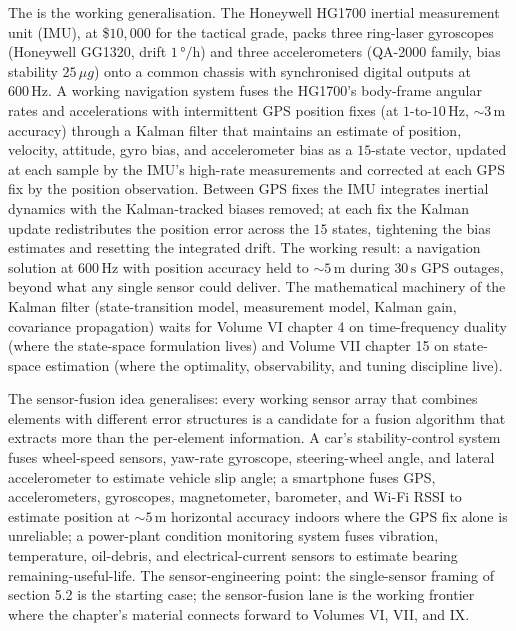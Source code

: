 The  is the working generalisation. The
Honeywell HG1700 \cite{text:ch05t3b-honeywell-hg1700-datasheet}
inertial measurement unit (IMU), at \$$10{,}000$ for the tactical
grade, packs three ring-laser gyroscopes (Honeywell GG1320, drift
$1 \,\si{\degree}/\si{\hour}$) and three accelerometers
(QA-2000 family, bias stability $25 \,\mu g$) onto a common
chassis with synchronised digital outputs at $600 \,\si{\hertz}$. A
working navigation system fuses the HG1700's body-frame angular
rates and accelerations with intermittent GPS position fixes (at
$1$-to-$10 \,\si{\hertz}$, $\sim 3 \,\si{\meter}$ accuracy) through
a Kalman filter that maintains an estimate of position, velocity,
attitude, gyro bias, and accelerometer bias as a $15$-state vector,
updated at each sample by the IMU's high-rate measurements and
corrected at each GPS fix by the position observation. Between GPS
fixes the IMU integrates inertial dynamics with the Kalman-tracked
biases removed; at each fix the Kalman update redistributes the
position error across the $15$ states, tightening the bias estimates
and resetting the integrated drift. The working result: a navigation
solution at $600 \,\si{\hertz}$ with position accuracy held to
$\sim 5 \,\si{\meter}$ during $30 \,\si{\second}$ GPS outages,
beyond what any single sensor could deliver. The mathematical
machinery of the Kalman filter (state-transition model, measurement
model, Kalman gain, covariance propagation) waits for Volume VI
chapter 4 on time-frequency duality (where the state-space
formulation lives) and Volume VII chapter 15 on state-space
estimation (where the optimality, observability, and tuning
discipline live).

The sensor-fusion idea generalises: every working sensor array that
combines elements with different error structures is a candidate
for a fusion algorithm that extracts more than the per-element
information. A car's stability-control system fuses wheel-speed
sensors, yaw-rate gyroscope, steering-wheel angle, and lateral
accelerometer to estimate vehicle slip angle; a smartphone fuses
GPS, accelerometers, gyroscopes, magnetometer, barometer, and
Wi-Fi RSSI to estimate position at $\sim 5 \,\si{\meter}$
horizontal accuracy indoors where the GPS fix alone is unreliable;
a power-plant condition monitoring system fuses vibration,
temperature, oil-debris, and electrical-current sensors to estimate
bearing remaining-useful-life. The sensor-engineering point: the
single-sensor framing of section 5.2 is the starting case; the
sensor-fusion lane is the working frontier where the chapter's
material connects forward to Volumes VI, VII, and IX.


